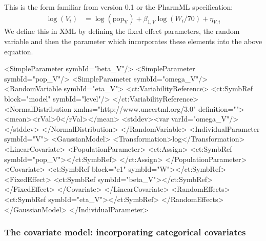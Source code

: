 \documentclass[a4paper,11pt]{article}
\newcommand{\pharmml}{PharmML\xspace}
\begin{document}
This is the form familiar from version 0.1 or the \pharmml specification:
%
\begin{align}
\log(V_i) &= \log(\mathrm{pop_{V}}) + \beta_{1,V}\log(W_i/70) + \eta_{V,i}
\end{align}
%
We define this in XML by defining the fixed effect parameters, the random
variable and then the parameter which incorporates these elements into
the above equation.
%
\begin{xmlcode}
<SimpleParameter symbId="beta_V"/>
<SimpleParameter symbId="pop_V"/>
<SimpleParameter symbId="omega_V"/>
<RandomVariable symbId="eta_V">
    <ct:VariabilityReference>
       <ct:SymbRef block="model" symbId="level"/>
    </ct:VariabilityReference>
    <NormalDistribution xmlns="http://www.uncertml.org/3.0" definition="">
        <mean><rVal>0</rVal></mean>
        <stddev><var varId="omega_V"/></stddev>
    </NormalDistribution>                            
</RandomVariable>
<IndividualParameter symbId="V">
    <GaussianModel>
        <Transformation>log</Transformation>
        <LinearCovariate>
            <PopulationParameter>
                <ct:Assign>
                    <ct:SymbRef symbId="pop_V"></ct:SymbRef>
                </ct:Assign>
            </PopulationParameter>
            <Covariate>
                <ct:SymbRef block="c1" symbId="W"></ct:SymbRef>
                <FixedEffect>
                    <ct:SymbRef symbId="beta_V"></ct:SymbRef>
                </FixedEffect>
            </Covariate>
        </LinearCovariate>
        <RandomEffects>
            <ct:SymbRef symbId="eta_V"></ct:SymbRef>
        </RandomEffects>
    </GaussianModel>
</IndividualParameter>
\end{xmlcode}

\subsubsection{The covariate model: incorporating categorical covariates}
\end{document}
